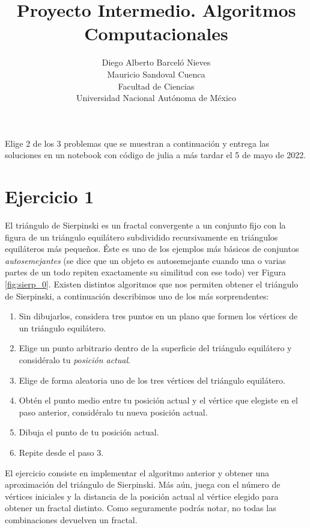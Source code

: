\documentclass[a4paper]{article}
\begin{document}
\title{Proyecto Intermedio. Algoritmos Computacionales}
\author{Diego Alberto Barceló Nieves  \\ Mauricio Sandoval Cuenca \\ Facultad de Ciencias \\ Universidad Nacional Autónoma de México}
\date{}
\maketitle

Elige 2 de los 3 problemas que se muestran a continuación y entrega las soluciones en un notebook con código de julia a más tardar el 5 de mayo de 2022. 


\section*{Ejercicio 1} \label{Sec: Ejercicio 1}

El triángulo de Sierpinski es un fractal convergente a un conjunto fijo con la figura de un triángulo equilátero subdividido recursivamente en triángulos equiláteros más pequeños. Éste es uno de los ejemplos más básicos de conjuntos \textit{autosemejantes} (se dice que un objeto es autosemejante cuando una o varias partes de un todo repiten exactamente su similitud con ese todo) ver Figura \ref{fig:sierp_0}. Existen distintos algoritmos que nos permiten obtener el triángulo de Sierpinski, a continuación describimos uno de los más sorprendentes:

\begin{enumerate}
    \item Sin dibujarlos, considera tres puntos en un plano que formen los vértices de un triángulo equilátero.
    \item Elige un punto arbitrario dentro de la superficie del triángulo equilátero y considéralo tu \textit{posición actual}.
    \item Elige de forma aleatoria uno de los tres vértices del triángulo equilátero.
    \item Obtén el punto medio entre tu posición actual y el vértice que elegiste en el paso anterior, considéralo tu nueva posición actual.
    \item Dibuja el punto de tu posición actual.
    \item Repite desde el paso 3.
\end{enumerate}

El ejercicio consiste en implementar el algoritmo anterior y obtener una aproximación del triángulo de Sierpinski. Más aún, juega con el número de vértices iniciales y la distancia de la posición actual al vértice elegido para obtener un fractal distinto. Como seguramente podrás notar, no todas las combinaciones devuelven un fractal.
\end{document}

